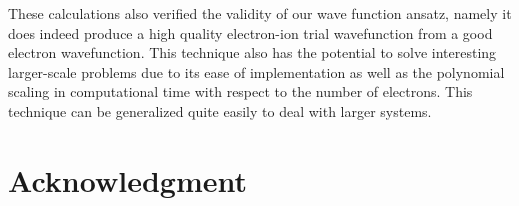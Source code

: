 \documentclass[pra,superscriptaddress,groupedaddress,twocolumn]{revtex4}
\begin{document}
These calculations also verified the validity of our wave function ansatz, namely it does indeed produce a high quality electron-ion trial wavefunction from a good electron wavefunction. This technique also has the potential to solve interesting larger-scale problems due to its ease of implementation as well as the polynomial scaling in computational time with respect to the number of electrons.  This technique can be generalized quite easily to deal with larger systems. 

\section{Acknowledgment}



\end{document}
